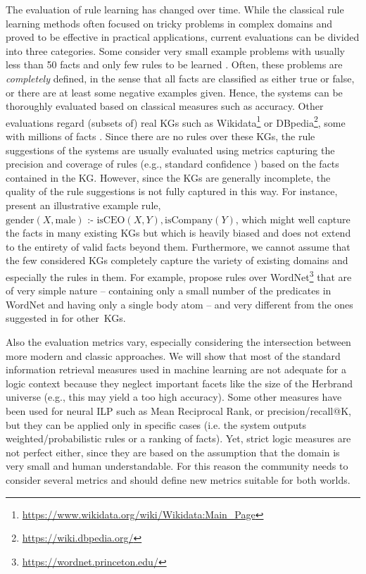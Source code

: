 \documentclass[letterpaper]{article} \usepackage{aaai20}  \usepackage{times}  \usepackage{helvet} \usepackage{courier}  \usepackage[hyphens]{url}  \usepackage{graphicx} \urlstyle{rm} \def\UrlFont{\rm}  \usepackage{graphicx}  \frenchspacing  \setlength{\pdfpagewidth}{8.5in}  \setlength{\pdfpageheight}{11in}  \usepackage{amsthm}
\theoremstyle{definition}
\newcommand{\ass}{\text{ :- }}
\newcommand{\expred}[1]{\textrm{#1}\xspace}
\newcommand{\exconst}[1]{\textrm{#1}\xspace}
\newcommand{\citet}[1]{\citeauthor{#1} \shortcite{#1}}
\begin{document}
The evaluation of rule learning has changed over time.
While the classical rule learning methods often focused on tricky problems in complex domains  \cite{ILPdatasets,Quinlan-ML90:foil} and proved to be effective in practical applications, 
current evaluations can be divided into three categories. 
Some consider very small example problems with usually less than 50 facts and only few rules to be learned \cite{EGre-jair18:learning-explanatory-rules,RoR-NIPS17,minervini2019differentiable}. 
Often, these problems are \emph{completely} defined, in the sense that all facts are classified as either true or false, or there are at least some negative examples given.
Hence, the systems can be thoroughly evaluated based on classical measures such as accuracy.
Other evaluations regard (subsets of) real KGs such as Wikidata\footnote{\url{https://www.wikidata.org/wiki/Wikidata:Main_Page}}
or DBpedia\footnote{\url{https://wiki.dbpedia.org/}}, some with millions of facts
\cite{Galarraga+-VLDBJ15:amiep,OWaWa-IJCAI18:scalable-rule-learning,Ho+-ISWC18:guided-by-embedding,RDFRules}. Since there are no rules over these KGs, the rule suggestions of the systems are usually evaluated using metrics capturing the precision and coverage of rules (e.g., standard confidence \cite{Galarraga+-VLDBJ15:amiep})
based on the facts contained in the KG.
However, since the KGs are generally incomplete, the quality of the rule suggestions is not fully captured in this way. For instance, \citet{OWaWa-IJCAI18:scalable-rule-learning} present an illustrative example rule, 
$\expred{gender}(X,\exconst{male})\ass\expred{isCEO}(X,Y),\expred{isCompany}(Y)$,
which might well capture the facts in many existing KGs but which is heavily biased and does not extend to the entirety of valid facts beyond them.
Furthermore, we cannot assume that the few considered KGs completely capture the variety of existing domains and especially the rules in them. For example, \citet{Minervini+-NAMPI18:ntp-at-scale} propose rules over WordNet\footnote{\url{https://wordnet.princeton.edu/}} that are of very simple nature -- containing only a small number of the predicates in WordNet and having only a single body atom -- and very different from the ones suggested in \cite{Galarraga+-VLDBJ15:amiep} for other~KGs.


Also the evaluation metrics vary, especially considering the intersection between more modern and classic approaches. We will show that most of the standard information retrieval measures used in machine learning are not adequate for a logic context because they neglect important facets like the size of the Herbrand universe (e.g., this may yield a too high accuracy).
Some other measures have been used for neural ILP such as Mean Reciprocal Rank, or precision/recall@K, but they can be applied only in specific cases (i.e. the system outputs weighted/probabilistic rules or a ranking of facts).
Yet, strict logic measures are not perfect either, since they are based on the assumption that the domain is very small and human understandable. For this reason the community needs to consider several metrics and should define new metrics suitable for both worlds.
\end{document}
